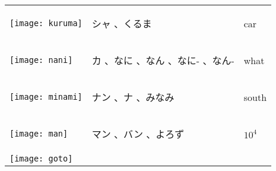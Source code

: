 \documentclass[a4paper,12pt]{extarticle}
\begin{document}
\begin{longtable}{|lp{6cm}p{4cm}|}
	\begin{minipage}{0.3\textwidth}
		\centerline{
			\texttt{[image: kuruma]}
		}
	\end{minipage}
	                                   &
	\begin{CJK}{UTF8}{min} シャ 、くるま\end{CJK}
	                                   &
	car
	\\
	\begin{minipage}{0.3\textwidth}
		\centerline{
			\texttt{[image: nani]}
		}
	\end{minipage}
	                                   &
	\begin{CJK}{UTF8}{min} カ 、なに 、なん 、なに- 、なん-\end{CJK}
	                                   &
	what
	\\
	\begin{minipage}{0.3\textwidth}
		\centerline{
			\texttt{[image: minami]}
		}
	\end{minipage}
	                                   &
	\begin{CJK}{UTF8}{min} ナン 、ナ 、みなみ\end{CJK}
	                                   &
	south
	\\
	\begin{minipage}{0.3\textwidth}
		\centerline{
			\texttt{[image: man]}
		}
	\end{minipage}
	                                   &
	\begin{CJK}{UTF8}{min} マン 、バン 、よろず\end{CJK}
	                                   &
	$10^{4}$
	\\
	\begin{minipage}{0.3\textwidth}
		\centerline{
			\texttt{[image: goto]}
}
\end{minipage}
\end{longtable}
\end{document}

